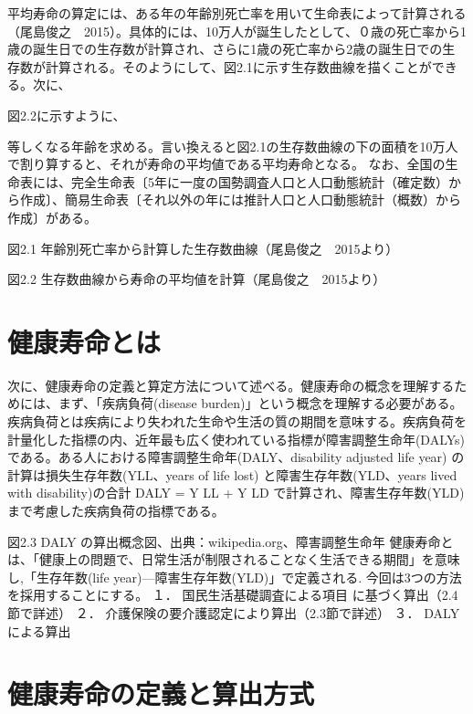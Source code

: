 平均寿命の算定には、ある年の年齢別死亡率を用いて生命表によって計算される（尾島俊之　2015）。具体的には、10万人が誕生したとして、０歳の死亡率から1歳の誕生日での生存数が計算され、さらに1歳の死亡率から2歳の誕生日での生存数が計算される。そのようにして、図2.1に示す生存数曲線を描くことができる。次に、

図2.2に示すように、

等しくなる年齢を求める。言い換えると図2.1の生存数曲線の下の面積を10万人で割り算すると、それが寿命の平均値である平均寿命となる。
なお、全国の生命表には、完全生命表〔5年に一度の国勢調査人口と人口動態統計（確定数）から作成〕、簡易生命表〔それ以外の年には推計人口と人口動態統計（概数）から作成〕がある。



図2.1 年齢別死亡率から計算した生存数曲線（尾島俊之　2015より）

図2.2 生存数曲線から寿命の平均値を計算（尾島俊之　2015より）




\section{健康寿命とは}


次に、健康寿命の定義と算定方法について述べる。健康寿命の概念を理解するためには、まず、「疾病負荷(disease burden)」という概念を理解する必要がある。疾病負荷とは疾病により失われた生命や生活の質の期間を意味する。疾病負荷を計量化した指標の内、近年最も広く使われている指標が障害調整生命年(DALYs) である。ある人における障害調整生命年(DALY、disability adjusted life year) の計算は損失生存年数(YLL、years of life lost) と障害生存年数(YLD、years lived with disability)の合計
DALY = Y LL + Y LD
で計算され、障害生存年数(YLD)まで考慮した疾病負荷の指標である。

図2.3 DALY の算出概念図、出典：wikipedia.org、障害調整生命年
健康寿命とは、「健康上の問題で、日常生活が制限されることなく生活できる期間」を意味し,「生存年数(life year)—障害生存年数(YLD)」で定義される.
今回は3つの方法を採用することにする。
１．	国民生活基礎調査による項目  に基づく算出（2.4節で詳述）
２．	介護保険の要介護認定により算出（2.3節で詳述）
３．	DALYによる算出


\section{健康寿命の定義と算出方式}

